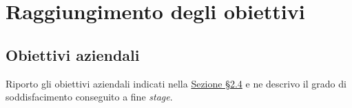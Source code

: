 \section{Raggiungimento degli obiettivi}
\label{sez:raggiungimento-obiettivi}

\subsection{Obiettivi aziendali}
\label{subsec:raggiungimento-obiettivi-aziendali}

Riporto gli obiettivi aziendali indicati nella \hyperref[sez:obiettivi-aziendali]{Sezione §2.4} e ne descrivo il grado di soddisfacimento conseguito a fine \textit{stage}.\\

\renewcommand{\arraystretch}{1.5} %

